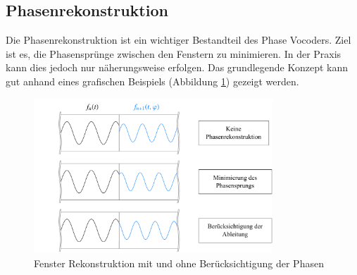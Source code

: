 \subsection{Phasenrekonstruktion
\label{autotune:subsection:fensterRekonstruktion}}
%
Die Phasenrekonstruktion ist ein wichtiger Bestandteil des Phase Vocoders.
Ziel ist es, die Phasensprünge zwischen den Fenstern zu minimieren.
In der Praxis kann dies jedoch nur näherungsweise erfolgen.
Das grundlegende Konzept kann gut anhand eines grafischen Beispiels (Abbildung \ref{autotune:fig:phaseReconstruction}) gezeigt werden.
\begin{figure}
    \centering
    \includegraphics[width=0.8\textwidth]{papers/autotune/images/Fenster-Rekonstruktion.pdf}
    \caption{Fenster Rekonstruktion mit und ohne Berücksichtigung der Phasen}
    \label{autotune:fig:phaseReconstruction}
\end{figure}

